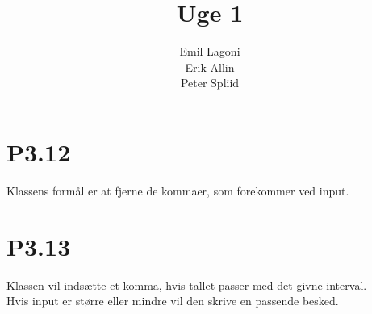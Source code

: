 \documentclass[12pt,a4paper]{article}
\title{Uge 1}
\author{Emil Lagoni\\Erik Allin\\Peter Spliid}
\begin{document}
\maketitle
\section*{P3.12}
Klassens formål er at fjerne de kommaer, som forekommer ved input.

\section*{P3.13}
Klassen vil indsætte et komma, hvis tallet passer med det givne interval.\\
Hvis input er større eller mindre vil den skrive en passende besked.
\end{document}
